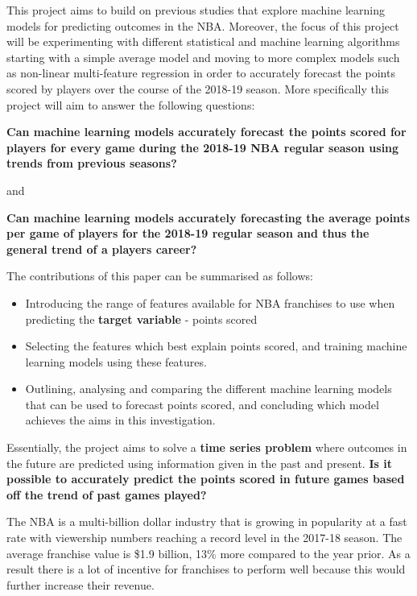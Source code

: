\documentclass[a4paper,11pt,twoside]{article}
\begin{document}
This project aims to build on previous studies that explore machine learning models for predicting outcomes in the NBA. Moreover, the focus of this project will be experimenting with different statistical and machine learning algorithms starting with a simple average model and moving to more complex models such as non-linear multi-feature regression in order to accurately forecast the points scored by players over the course of the 2018-19 season. More specifically this project will aim to answer the following questions:

\begin{center}
\textbf{Can machine learning models accurately forecast the points scored for players for every game during the 2018-19 NBA regular season using trends from previous seasons?}

and 

\textbf{Can machine learning models accurately forecasting the average points per game of players for the 2018-19 regular season and thus the general trend of a players career?}
\end{center}
\vspace{7mm}

The contributions of this paper can be summarised as follows:
\begin{itemize}
    \item Introducing the range of features available for NBA franchises to use when predicting the \textbf{target variable} - points scored
    \item Selecting the features which best explain points scored, and training machine learning models using these features.
    \item Outlining, analysing and comparing the different machine learning models that can be used to forecast points scored, and concluding which model achieves the aims in this investigation.
\end{itemize}
Essentially, the project aims to solve a \textbf{time series problem} where outcomes in the future are predicted using information given in the past and present. \textbf{Is it possible to accurately predict the points scored in future games based off the trend of past games played?}

The NBA is a multi-billion dollar industry that is growing in popularity at a fast rate with viewership numbers reaching a record level in the 2017-18 season. The average franchise value is \$1.9 billion, 13\% more compared to the year prior. As a result there is a lot of incentive for franchises to perform well because this would further increase their revenue.
\end{document}
